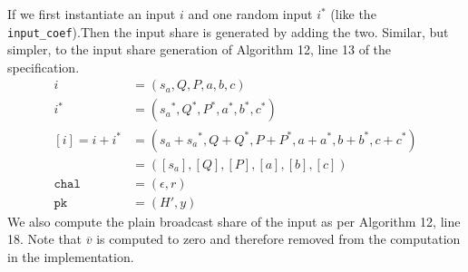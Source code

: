 \documentclass[twoside,11pt,openright]{report}
\theoremstyle{definition}
\theoremstyle{plain}
\begin{document}
If we first instantiate an input $i$ and one random input $i^*$ (like the \texttt{input\_coef}).Then the input share is generated by adding the two. Similar, but simpler, to the input share generation of Algorithm 12, line 13 of the specification.
\begin{align*}
  i             & = (s_a, Q, P, a,b,c)                                             \\
  i^*           & = ({s_a}^*, Q^*, P^*, a^*,b^*,c^*)                               \\
  [i] = i + i^* & = ({s_a} + {s_a}^*, Q + Q^*, P + P^*, a + a^*, b + b^*, c + c^*) \\
                & = ([s_a], [Q], [P], [a], [b], [c])                               \\
  \texttt{chal} & = (\epsilon, r)                                                  \\
  \texttt{pk}   & = (H', y)
\end{align*}
We also compute the plain broadcast share of the input as per Algorithm 12, line 18. Note that $\overline{v}$ is computed to zero and therefore removed from the computation in the implementation.
\end{document}
